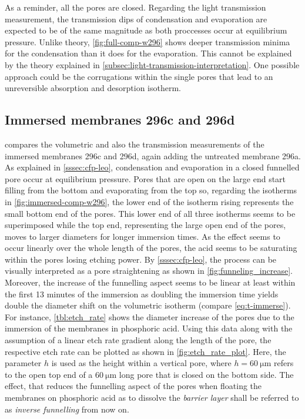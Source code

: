 \documentclass[thesis.tex]{subfiles}
\begin{document}
          As a reminder, all the pores are closed. Regarding the light transmission measurement, the transmission dips of condensation and evaporation are expected to be of the same magnitude as both proccesses occur at equilibrium pressure. Unlike theory, \cref{fig:full-comp-w296} shows deeper transmission minima for the condensation than it does for the evaporation. This cannot be explained by the theory explained in \cref{subsec:light-transmission-interpretation}. One possible approach could be the corrugations within the single pores that lead to an unreversible absorption and desorption isotherm.

          


      \subsection{Immersed membranes 296c and 296d}
      \label{subsec:immersed-membranes}

          

           compares the volumetric and also the transmission measurements of the immersed membranes 296c and 296d, again adding the untreated membrane 296a. As explained in \cref{sssec:cfp-leo}, condensation and evaporation in a closed funnelled pore occur at equilibrium pressure. Pores that are open on the large end start filling from the bottom and evaporating from the top so, regarding the isotherms in \cref{fig:immersed-comp-w296}, the lower end of the isotherm rising represents the small bottom end of the pores. This lower end of all three isotherms seems to be superimposed while the top end, representing the large open end of the pores, moves to larger diameters for longer immersion times. As the effect seems to occur linearly over the whole length of the pores, the acid seems to be saturating within the pores losing etching power. By \cref{sssec:cfp-leo}, the process can be visually interpreted as a pore straightening as shown in \cref{fig:funneling_increase}. Moreover, the increase of the funnelling aspect seems to be linear at least within the first 13 minutes of the immersion as doubling the immersion time yields double the diameter shift on the volumetric isotherm (compare \cref{eq:t-immerse}). For instance, \cref{tbl:etch_rate} shows the diameter increase of the pores due to the immersion of the membranes in phosphoric acid. Using this data along with the assumption of a linear etch rate gradient along the length of the pore, the respective etch rate can be plotted as shown in \cref{fig:etch_rate_plot}. Here, the parameter $h$ is used as the height within a vertical pore, where $h=\SI{60}{\micro\meter}$ refers to the open top end of a $\SI{60}{\micro\meter}$ long pore that is closed on the bottom side. The effect, that reduces the funnelling aspect of the pores when floating the membranes on phosphoric acid as to dissolve the \textit{barrier layer} shall be referred to as \textit{inverse funnelling} from now on.
\end{document}
